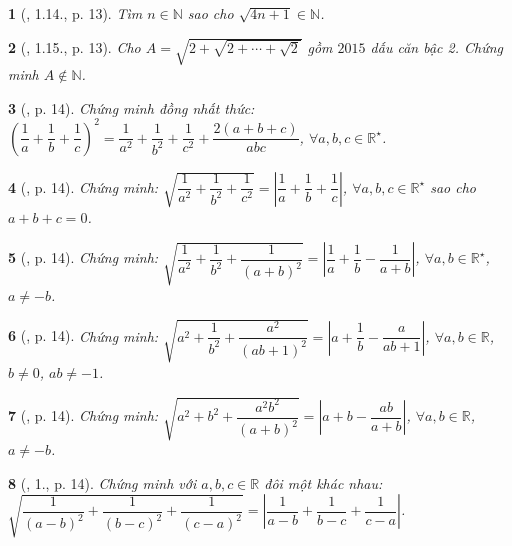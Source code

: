 \documentclass{article}
\newtheorem{baitoan}{}%
\begin{document}
\begin{baitoan}[\cite{Binh_boi_duong_Toan_9_tap_1}, 1.14., p. 13]
	Tìm $n\in\mathbb{N}$ sao cho $\sqrt{4n + 1}\in\mathbb{N}$.
\end{baitoan}

\begin{baitoan}[\cite{Binh_boi_duong_Toan_9_tap_1}, 1.15., p. 13]
	Cho $A = \sqrt{2 + \sqrt{2 + \cdots + \sqrt{2}}}$ gồm $2015$ dấu căn bậc 2. Chứng minh $A\notin\mathbb{N}$.
\end{baitoan}

\begin{baitoan}[\cite{Binh_boi_duong_Toan_9_tap_1}, p. 14]
	Chứng minh đồng nhất thức: $\left(\dfrac{1}{a} + \dfrac{1}{b} + \dfrac{1}{c}\right)^2 = \dfrac{1}{a^2} + \dfrac{1}{b^2} + \dfrac{1}{c^2} + \dfrac{2(a + b + c)}{abc}$, $\forall a,b,c\in\mathbb{R}^\star$.
\end{baitoan}

\begin{baitoan}[\cite{Binh_boi_duong_Toan_9_tap_1}, p. 14]
	Chứng minh: $\sqrt{\dfrac{1}{a^2} + \dfrac{1}{b^2} + \dfrac{1}{c^2}} = \left|\dfrac{1}{a} + \dfrac{1}{b} + \dfrac{1}{c}\right|$, $\forall a,b,c\in\mathbb{R}^\star$ sao cho $a + b + c = 0$.
\end{baitoan}

\begin{baitoan}[\cite{Binh_boi_duong_Toan_9_tap_1}, p. 14]
	Chứng minh: $\sqrt{\dfrac{1}{a^2} + \dfrac{1}{b^2} + \dfrac{1}{(a + b)^2}} = \left|\dfrac{1}{a} + \dfrac{1}{b} - \dfrac{1}{a + b}\right|$, $\forall a,b\in\mathbb{R}^\star$, $a\ne-b$.
\end{baitoan}

\begin{baitoan}[\cite{Binh_boi_duong_Toan_9_tap_1}, p. 14]
	Chứng minh: $\sqrt{a^2 + \dfrac{1}{b^2} + \dfrac{a^2}{(ab + 1)^2}} = \left|a + \dfrac{1}{b} - \dfrac{a}{ab + 1}\right|$, $\forall a,b\in\mathbb{R}$, $b\ne0$, $ab\ne-1$.
\end{baitoan}

\begin{baitoan}[\cite{Binh_boi_duong_Toan_9_tap_1}, p. 14]
	Chứng minh: $\sqrt{a^2 + b^2 + \dfrac{a^2b^2}{(a + b)^2}} = \left|a + b - \dfrac{ab}{a + b}\right|$, $\forall a,b\in\mathbb{R}$, $a\ne-b$.
\end{baitoan}

\begin{baitoan}[\cite{Binh_boi_duong_Toan_9_tap_1}, 1., p. 14]
	Chứng minh với $a,b,c\in\mathbb{R}$ đôi một khác nhau: $\sqrt{\dfrac{1}{(a - b)^2} + \dfrac{1}{(b - c)^2} + \dfrac{1}{(c - a)^2}} = \left|\dfrac{1}{a - b} + \dfrac{1}{b - c} + \dfrac{1}{c - a}\right|$.
\end{baitoan}
\end{document}
